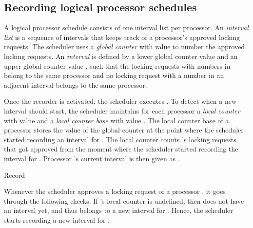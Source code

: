 \subsection{Recording logical processor schedules}\label{sec:recording logical processor schedules}
A logical processor schedule consists of one interval list per processor. An \emph{interval list} is a sequence of intervals that keeps track of a processor's approved locking requests. The scheduler uses a \emph{global counter} with value  to number the approved locking requests. An \emph{interval}  is defined by a lower global counter value  and an upper global counter value , such that the locking requests with numbers in  belong to the same processor and no locking request with a number in an adjacent interval belongs to the same processor.

Once the recorder is activated, the scheduler executes . To detect when a new interval should start, the scheduler maintains for each processor a \emph{local counter} with value  and a \emph{local counter base} with value . The local counter base of a processor  stores the value of the global counter at the point where the scheduler started recording an interval for . The local counter counts 's locking requests that got approved from the moment where the scheduler started recording the interval for . Processor 's current interval is then given as .

\begin{algorithm}[!ht]


\caption{Record\label{alg:record}}
\end{algorithm}

Whenever the scheduler approves a locking request  of a processor , it goes through the following checks. If 's local counter is undefined, then  does not have an interval yet, and thus  belongs to a new interval for . Hence, the scheduler starts recording a new interval for . 

